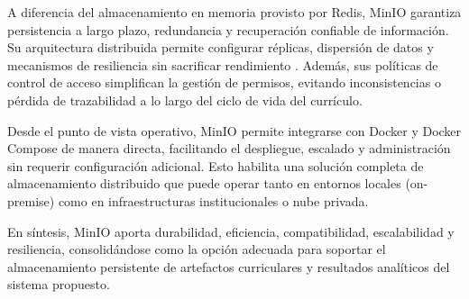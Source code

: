 {{        A diferencia del almacenamiento en memoria provisto por Redis, MinIO garantiza 
        persistencia a largo plazo, redundancia y recuperación confiable de información. 
        Su arquitectura distribuida permite configurar réplicas, dispersión de datos y 
        mecanismos de resiliencia sin sacrificar rendimiento \citep{adler2023evaluating}. 
        Además, sus políticas de control de acceso simplifican la gestión de permisos, 
        evitando inconsistencias o pérdida de trazabilidad a lo largo del ciclo de vida 
        del currículo.

        Desde el punto de vista operativo, MinIO permite integrarse con Docker y Docker 
        Compose de manera directa, facilitando el despliegue, escalado y administración sin 
        requerir configuración adicional. Esto habilita una solución completa de 
        almacenamiento distribuido que puede operar tanto en entornos locales (on-premise) 
        como en infraestructuras institucionales o nube privada.

        En síntesis, MinIO aporta durabilidad, eficiencia, compatibilidad, escalabilidad y 
        resiliencia, consolidándose como la opción adecuada para soportar el almacenamiento 
        persistente de artefactos curriculares y resultados analíticos del sistema propuesto.
        
    }

    
    }
